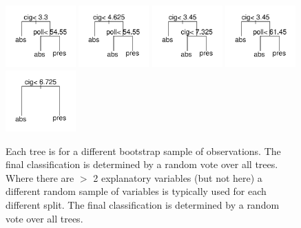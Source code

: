 \documentclass[12pt, a4paper,  BCOR=8.25mm, DIV=15]{scrartcl}\usepackage[]{graphicx}\usepackage[]{color}
\newenvironment{knitrout}{}{} %
\begin{document}
\begin{figure}
\begin{knitrout}
{\includegraphics[width=0.24\textwidth]{figs/xmeth-rf-x-bronchit-8} 
\includegraphics[width=0.24\textwidth]{figs/xmeth-rf-x-bronchit-9} 
\includegraphics[width=0.24\textwidth]{figs/xmeth-rf-x-bronchit-10} 
\includegraphics[width=0.24\textwidth]{figs/xmeth-rf-x-bronchit-11} 
\includegraphics[width=0.24\textwidth]{figs/xmeth-rf-x-bronchit-12} 

}



\end{knitrout}
\caption{Each tree is for a different bootstrap sample of
  observations.  The final classification is determined by a random
  vote over all trees.  Where there are $>$ 2 explanatory variables
  (but not here) a different random sample of variables is typically
  used for each different split. The final classification is
  determined by a random vote over all trees.}\label{fig:brontrees}
\end{figure}
\end{document}
